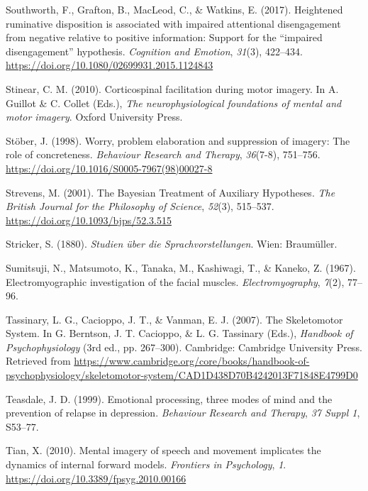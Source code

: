 \documentclass[a4paper,12pt,twoside,onecolumn,openright,final,oldfontcommands]{memoir}
\begin{document}
\leavevmode\hypertarget{ref-southworth_heightened_2017}{}%
Southworth, F., Grafton, B., MacLeod, C., \& Watkins, E. (2017). Heightened ruminative disposition is associated with impaired attentional disengagement from negative relative to positive information: Support for the ``impaired disengagement'' hypothesis. \emph{Cognition and Emotion}, \emph{31}(3), 422--434. \url{https://doi.org/10.1080/02699931.2015.1124843}

\leavevmode\hypertarget{ref-stinear_corticospinal_2010}{}%
Stinear, C. M. (2010). Corticospinal facilitation during motor imagery. In A. Guillot \& C. Collet (Eds.), \emph{The neurophysiological foundations of mental and motor imagery}. Oxford University Press.

\leavevmode\hypertarget{ref-stober_worry_1998}{}%
Stöber, J. (1998). Worry, problem elaboration and suppression of imagery: The role of concreteness. \emph{Behaviour Research and Therapy}, \emph{36}(7-8), 751--756. \url{https://doi.org/10.1016/S0005-7967(98)00027-8}

\leavevmode\hypertarget{ref-strevens_bayesian_2001}{}%
Strevens, M. (2001). The Bayesian Treatment of Auxiliary Hypotheses. \emph{The British Journal for the Philosophy of Science}, \emph{52}(3), 515--537. \url{https://doi.org/10.1093/bjps/52.3.515}

\leavevmode\hypertarget{ref-stricker_studien_1880}{}%
Stricker, S. (1880). \emph{Studien über die Sprachvorstellungen}. Wien: Braumüller.

\leavevmode\hypertarget{ref-sumitsuji_electromyographic_1967}{}%
Sumitsuji, N., Matsumoto, K., Tanaka, M., Kashiwagi, T., \& Kaneko, Z. (1967). Electromyographic investigation of the facial muscles. \emph{Electromyography}, \emph{7}(2), 77--96.

\leavevmode\hypertarget{ref-berntson_skeletomotor_2007}{}%
Tassinary, L. G., Cacioppo, J. T., \& Vanman, E. J. (2007). The Skeletomotor System. In G. Berntson, J. T. Cacioppo, \& L. G. Tassinary (Eds.), \emph{Handbook of Psychophysiology} (3rd ed., pp. 267--300). Cambridge: Cambridge University Press. Retrieved from \url{https://www.cambridge.org/core/books/handbook-of-psychophysiology/skeletomotor-system/CAD1D438D70B4242013F71848E4799D0}

\leavevmode\hypertarget{ref-teasdale_emotional_1999}{}%
Teasdale, J. D. (1999). Emotional processing, three modes of mind and the prevention of relapse in depression. \emph{Behaviour Research and Therapy}, \emph{37 Suppl 1}, S53--77.

\leavevmode\hypertarget{ref-tian_mental_2010}{}%
Tian, X. (2010). Mental imagery of speech and movement implicates the dynamics of internal forward models. \emph{Frontiers in Psychology}, \emph{1}. \url{https://doi.org/10.3389/fpsyg.2010.00166}
\end{document}
